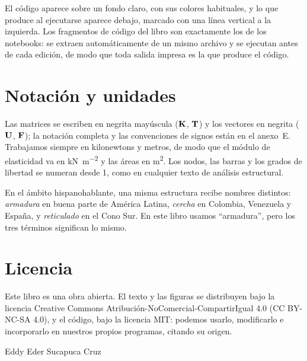 El código aparece sobre un fondo claro, con sus colores habituales, y lo que
produce al ejecutarse aparece debajo, marcado con una línea vertical a la
izquierda. Los fragmentos de código del libro son exactamente los de los
notebooks: se extraen automáticamente de un mismo archivo y se ejecutan antes
de cada edición, de modo que toda salida impresa es la que produce el código.

\section*{Notación y unidades}

Las matrices se escriben en negrita mayúscula ($\mathbf{K}$, $\mathbf{T}$) y los vectores
en negrita ($\mathbf{U}$, $\mathbf{F}$); la notación completa y las convenciones de signos
están en el anexo~E. Trabajamos siempre en kilonewtons y metros, de modo que
el módulo de elasticidad va en \si{\kilo\newton\per\metre\squared} y las
áreas en \si{\metre\squared}. Los nodos, las barras y los grados de libertad
se numeran desde 1, como en cualquier texto de análisis estructural.

\begin{parasabermas}
En el ámbito hispanohablante, una misma estructura recibe nombres distintos:
\emph{armadura} en buena parte de América Latina, \emph{cercha} en Colombia,
Venezuela y España, y \emph{reticulado} en el Cono Sur. En este libro usamos
\enquote{armadura}, pero los tres términos significan lo mismo.
\end{parasabermas}

\section*{Licencia}

Este libro es una obra abierta. El texto y las figuras se distribuyen bajo la
licencia Creative Commons Atribución-NoComercial-CompartirIgual 4.0 (CC BY-NC-SA
4.0), y el código, bajo la licencia MIT: podemos usarlo, modificarlo e
incorporarlo en nuestros propios programas, citando su origen.

\bigskip
\noindent Eddy Eder Sucapuca Cruz
